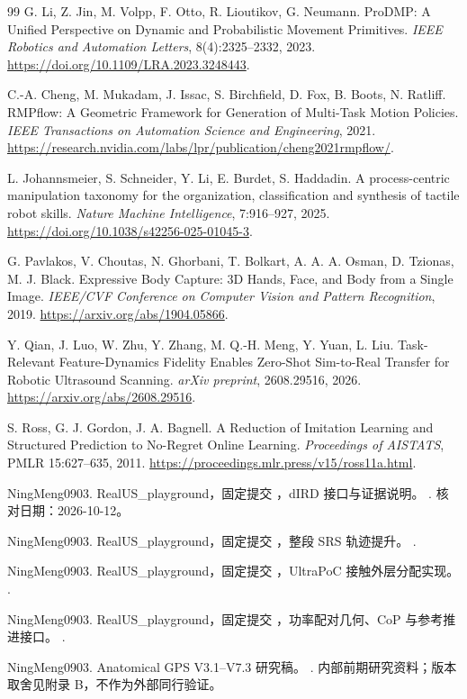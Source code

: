\documentclass[UTF8,11pt,a4paper,fontset=fandol]{ctexart}
\numberwithin{equation}{section}
\theoremstyle{definition}
\newcommand{\RealBase}{https://github.com/NingMeng0903/RealUS_playground/blob/6a943e3dcf8c6ea68b9f75c398eb1f4307a9b81a}
\newcommand{\code}[1]{\texttt{\detokenize{#1}}}
\begin{document}
\begin{thebibliography}{99}
G. Li, Z. Jin, M. Volpp, F. Otto, R. Lioutikov, G. Neumann.
ProDMP: A Unified Perspective on Dynamic and Probabilistic Movement Primitives.
\emph{IEEE Robotics and Automation Letters}, 8(4):2325--2332, 2023.
\url{https://doi.org/10.1109/LRA.2023.3248443}.

C.-A. Cheng, M. Mukadam, J. Issac, S. Birchfield, D. Fox, B. Boots, N. Ratliff.
RMPflow: A Geometric Framework for Generation of Multi-Task Motion Policies.
\emph{IEEE Transactions on Automation Science and Engineering}, 2021.
\url{https://research.nvidia.com/labs/lpr/publication/cheng2021rmpflow/}.

L. Johannsmeier, S. Schneider, Y. Li, E. Burdet, S. Haddadin.
A process-centric manipulation taxonomy for the organization, classification and synthesis of tactile robot skills.
\emph{Nature Machine Intelligence}, 7:916--927, 2025.
\url{https://doi.org/10.1038/s42256-025-01045-3}.

G. Pavlakos, V. Choutas, N. Ghorbani, T. Bolkart, A. A. A. Osman, D. Tzionas, M. J. Black.
Expressive Body Capture: 3D Hands, Face, and Body from a Single Image.
\emph{IEEE/CVF Conference on Computer Vision and Pattern Recognition}, 2019.
\url{https://arxiv.org/abs/1904.05866}.

Y. Qian, J. Luo, W. Zhu, Y. Zhang, M. Q.-H. Meng, Y. Yuan, L. Liu.
Task-Relevant Feature-Dynamics Fidelity Enables Zero-Shot Sim-to-Real Transfer for Robotic Ultrasound Scanning.
\emph{arXiv preprint}, 2608.29516, 2026.
\url{https://arxiv.org/abs/2608.29516}.

S. Ross, G. J. Gordon, J. A. Bagnell.
A Reduction of Imitation Learning and Structured Prediction to No-Regret Online Learning.
\emph{Proceedings of AISTATS}, PMLR 15:627--635, 2011.
\url{https://proceedings.mlr.press/v15/ross11a.html}.

NingMeng0903. RealUS\_playground，固定提交 \code{6a943e3}，dIRD 接口与证据说明。
\href{\RealBase/ird_playground/README.md}{}. 核对日期：2026-10-12。

NingMeng0903. RealUS\_playground，固定提交 \code{6a943e3}，整段 SRS 轨迹提升。
\href{\RealBase/ird_playground/ird_playground/optimization/srs_trajectory_dp.py}{}.

NingMeng0903. RealUS\_playground，固定提交 \code{6a943e3}，UltraPoC 接触外层分配实现。
\href{\RealBase/peirastic/contact_qp/weighted_outer.py}{}.

NingMeng0903. RealUS\_playground，固定提交 \code{6a943e3}，功率配对几何、CoP 与参考推进接口。
\href{\RealBase/peirastic/contact_qp/geometry.py}{}.

NingMeng0903. Anatomical GPS V3.1--V7.3 研究稿。
\href{https://github.com/NingMeng0903/RealUS_playground/tree/6a943e3dcf8c6ea68b9f75c398eb1f4307a9b81a/NMI_idea/ideas}{}.
内部前期研究资料；版本取舍见附录 B，不作为外部同行验证。
\end{thebibliography}
\end{document}
